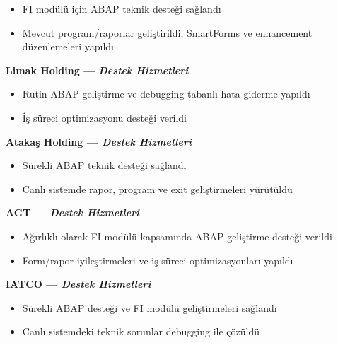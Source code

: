\documentclass[10pt,a4paper]{extarticle}
\begin{document}
\begin{itemize}[leftmargin=*,noitemsep,topsep=0pt]
    \item FI modülü için ABAP teknik desteği sağlandı
    \item Mevcut program/raporlar geliştirildi, SmartForms ve enhancement düzenlemeleri yapıldı
\end{itemize}
\textbf{Limak Holding \textnormal{--- \textit{Destek Hizmetleri}}}
\begin{itemize}[leftmargin=*,noitemsep,topsep=0pt]
    \item Rutin ABAP geliştirme ve debugging tabanlı hata giderme yapıldı
    \item İş süreci optimizasyonu desteği verildi
\end{itemize}
\textbf{Atakaş Holding \textnormal{--- \textit{Destek Hizmetleri}}}
\begin{itemize}[leftmargin=*,noitemsep,topsep=0pt]
    \item Sürekli ABAP teknik desteği sağlandı
    \item Canlı sistemde rapor, program ve exit geliştirmeleri yürütüldü
\end{itemize}
\textbf{AGT \textnormal{--- \textit{Destek Hizmetleri}}}
\begin{itemize}[leftmargin=*,noitemsep,topsep=0pt]
    \item Ağırlıklı olarak FI modülü kapsamında ABAP geliştirme desteği verildi
    \item Form/rapor iyileştirmeleri ve iş süreci optimizasyonları yapıldı
\end{itemize}
\textbf{IATCO \textnormal{--- \textit{Destek Hizmetleri}}}
\begin{itemize}[leftmargin=*,noitemsep,topsep=0pt]
    \item Sürekli ABAP desteği ve FI modülü geliştirmeleri sağlandı
    \item Canlı sistemdeki teknik sorunlar debugging ile çözüldü
\end{itemize}
\end{document}
